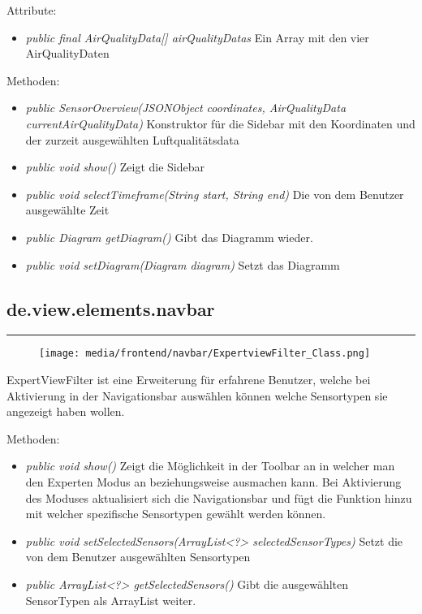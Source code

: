 Attribute:
\begin{itemize} 
    \item \emph{public final AirQualityData[] airQualityDatas} Ein Array mit den vier AirQualityDaten
\end{itemize}
Methoden:
\begin{itemize} 
    \item \emph{public SensorOverview(JSONObject coordinates, AirQualityData currentAirQualityData)} Konstruktor für die Sidebar mit den Koordinaten und der zurzeit ausgewählten Luftqualitätsdata
    \item \emph{public void show()} Zeigt die Sidebar
    \item \emph{public void selectTimeframe(String start, String end)} Die von dem Benutzer ausgewählte Zeit
    \item \emph{public Diagram getDiagram()} Gibt das Diagramm wieder.
    \item \emph{public void setDiagram(Diagram diagram)} Setzt das Diagramm
\end{itemize}

\subsection{de.view.elements.navbar}

\rule{\textwidth}{0.4pt} 
\begin{minipage}{0.3\textwidth}
    \begin{figure}[H]
        \texttt{[image: media/frontend/navbar/ExpertviewFilter\_Class.png]}
    \end{figure}
    \end{minipage} \hfill
    \begin{minipage}{0.6\textwidth}
ExpertViewFilter ist eine Erweiterung für erfahrene Benutzer, welche bei Aktivierung in der Navigationsbar auswählen können welche Sensortypen sie angezeigt haben wollen.
\end{minipage}

Methoden:
\begin{itemize} 
    \item \emph{public void show()} Zeigt die Möglichkeit in der Toolbar an in welcher man den Experten Modus an beziehungsweise ausmachen kann. Bei Aktivierung des Moduses aktualisiert sich die Navigationsbar und fügt die Funktion hinzu mit welcher spezifische Sensortypen gewählt werden können.
    \item \emph{public void setSelectedSensors(ArrayList<?> selectedSensorTypes)} Setzt die von dem Benutzer ausgewählten Sensortypen
    \item \emph{public ArrayList<?> getSelectedSensors()} Gibt die ausgewählten SensorTypen als ArrayList weiter.
\end{itemize}

